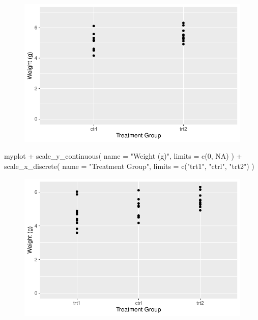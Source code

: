 \documentclass[
  letterpaper,
  DIV=11,
  numbers=noendperiod]{scrartcl}
\newenvironment{Shaded}{\begin{snugshade}}{\end{snugshade}}
\newcommand{\AttributeTok}[1]{\textcolor[rgb]{0.40,0.45,0.13}{#1}}
\newcommand{\ConstantTok}[1]{\textcolor[rgb]{0.56,0.35,0.01}{#1}}
\newcommand{\DecValTok}[1]{\textcolor[rgb]{0.68,0.00,0.00}{#1}}
\newcommand{\FunctionTok}[1]{\textcolor[rgb]{0.28,0.35,0.67}{#1}}
\newcommand{\NormalTok}[1]{\textcolor[rgb]{0.00,0.23,0.31}{#1}}
\newcommand{\SpecialCharTok}[1]{\textcolor[rgb]{0.37,0.37,0.37}{#1}}
\newcommand{\StringTok}[1]{\textcolor[rgb]{0.13,0.47,0.30}{#1}}
\begin{document}
\begin{figure}[H]

{\centering \includegraphics{ggplot2intro_files/figure-pdf/unnamed-chunk-8-1.pdf}

}

\end{figure}

\begin{Shaded}
\begin{Highlighting}[]
\NormalTok{myplot }\SpecialCharTok{+}
  \FunctionTok{scale\_y\_continuous}\NormalTok{(}
    \AttributeTok{name =} \StringTok{"Weight (g)"}\NormalTok{,}
    \AttributeTok{limits =} \FunctionTok{c}\NormalTok{(}\DecValTok{0}\NormalTok{, }\ConstantTok{NA}\NormalTok{)}
\NormalTok{  ) }\SpecialCharTok{+}
  \FunctionTok{scale\_x\_discrete}\NormalTok{(}
    \AttributeTok{name =} \StringTok{"Treatment Group"}\NormalTok{,}
    \AttributeTok{limits =} \FunctionTok{c}\NormalTok{(}\StringTok{"trt1"}\NormalTok{, }\StringTok{"ctrl"}\NormalTok{, }\StringTok{"trt2"}\NormalTok{)}
\NormalTok{  )}
\end{Highlighting}
\end{Shaded}

\begin{figure}[H]

{\centering \includegraphics{ggplot2intro_files/figure-pdf/unnamed-chunk-9-1.pdf}

}

\end{figure}
\end{document}
